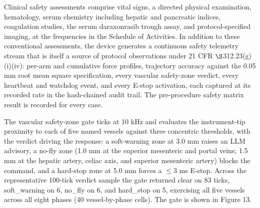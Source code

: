 Clinical safety assessments comprise vital signs, a directed physical examination,
hematology, serum chemistry including hepatic and pancreatic indices, coagulation
studies, the serum daraxonrasib trough assay, and protocol-specified imaging, at the
frequencies in the Schedule of Activities. In addition to these conventional
assessments, the device generates a continuous safety telemetry stream that is
itself a source of protocol observations under 21 CFR $\S$312.23(g)(i)(iv): per-arm
and cumulative force profiles, trajectory accuracy against the 0.05 mm root mean
square specification, every vascular safety-zone verdict, every heartbeat and
watchdog event, and every E-stop activation, each captured at its recorded rate in
the hash-chained audit trail. The pre-procedure safety matrix result is recorded for
every case.

The vascular safety-zone gate ticks at 10 kHz and evaluates the instrument-tip
proximity to each of five named vessels against three concentric thresholds, with
the verdict driving the response: a soft-warning zone at 3.0 mm raises an LLM
advisory, a no-fly zone (1.0 mm at the superior mesenteric and portal veins; 1.5 mm
at the hepatic artery, celiac axis, and superior mesenteric artery) blocks the
command, and a hard-stop zone at 5.0 mm forces a $\leq 3$ ms E-stop. Across the
representative 100-tick verdict sample the gate returned clear on 83 ticks,
soft\_warning on 6, no\_fly on 6, and hard\_stop on 5, exercising all five vessels
across all eight phases (40 vessel-by-phase cells). The gate is shown in Figure 13.

